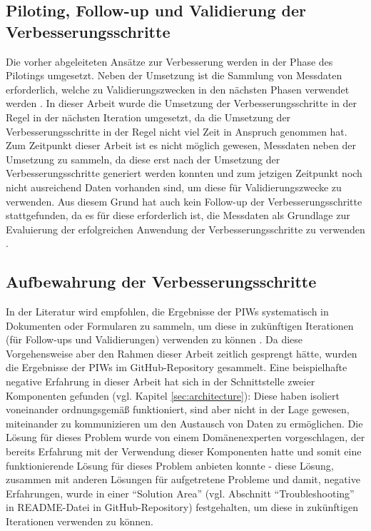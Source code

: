 \subsection{Piloting, Follow-up und Validierung der Verbesserungsschritte}
Die vorher abgeleiteten Ansätze zur Verbesserung werden in der Phase des Pilotings umgesetzt. Neben der Umsetzung ist die Sammlung von Messdaten erforderlich, welche zu Validierungszwecken in den nächsten Phasen verwendet werden \cite{salo2007iterative}. \newline In dieser Arbeit wurde die Umsetzung der Verbesserungsschritte in der Regel in der nächsten Iteration umgesetzt, da die Umsetzung der Verbesserungsschritte in der Regel nicht viel Zeit in Anspruch genommen hat. Zum Zeitpunkt dieser Arbeit ist es nicht möglich gewesen, Messdaten neben der Umsetzung zu sammeln, da diese erst nach der Umsetzung der Verbesserungsschritte generiert werden konnten und zum jetzigen Zeitpunkt noch nicht ausreichend Daten vorhanden sind, um diese für Validierungszwecke zu verwenden. Aus diesem Grund hat auch kein Follow-up der Verbesserungsschritte stattgefunden, da es für diese erforderlich ist, die Messdaten als Grundlage zur Evaluierung der erfolgreichen Anwendung der Verbesserungsschritte zu verwenden \cite{salo2007iterative}. 

\subsection{Aufbewahrung der Verbesserungsschritte}
In der Literatur wird empfohlen, die Ergebnisse der PIWs systematisch in Dokumenten oder Formularen zu sammeln, um diese in zukünftigen Iterationen (für Follow-ups und Validierungen) verwenden zu können \cite{salo2007iterative}. Da diese Vorgehensweise aber den Rahmen dieser Arbeit zeitlich gesprengt hätte, wurden die Ergebnisse der PIWs im GitHub-Repository gesammelt. Eine beispielhafte negative Erfahrung in dieser Arbeit hat sich in der Schnittstelle zweier Komponenten gefunden (vgl. Kapitel \ref{sec:architecture}): Diese haben isoliert voneinander ordnungsgemäß funktioniert, sind aber nicht in der Lage gewesen, miteinander zu kommunizieren um den Austausch von Daten zu ermöglichen. Die Lösung für dieses Problem wurde von einem Domänenexperten vorgeschlagen, der bereits Erfahrung mit der Verwendung dieser Komponenten hatte und somit eine funktionierende Lösung für dieses Problem anbieten konnte - diese Lösung, zusammen mit anderen Lösungen für aufgetretene Probleme und damit, negative Erfahrungen, wurde in einer \enquote{Solution Area} (vgl. Abschnitt \enquote{Troubleshooting} in README-Datei in GitHub-Repository) festgehalten, um diese in zukünftigen Iterationen verwenden zu können. 